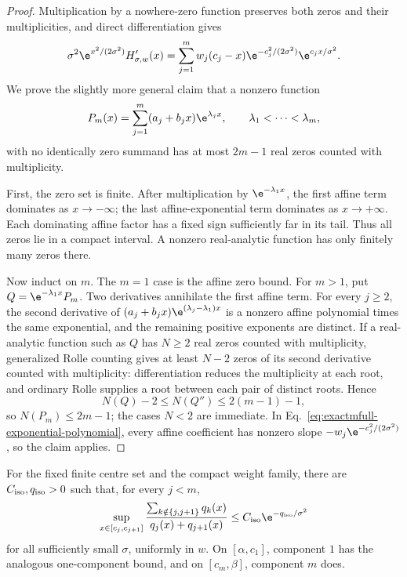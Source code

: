 \begin{proof}
Multiplication by a nowhere-zero function preserves both zeros and their
multiplicities, and direct differentiation gives
\begin{equation}
 \sigma^2\e^{x^2/(2\sigma^2)}H_{\sigma,w}'(x)
 =\sum_{j=1}^m w_j(c_j-x)
   \e^{-c_j^2/(2\sigma^2)}\e^{c_jx/\sigma^2}.
 \label{eq:exactmfull-exponential-polynomial}
\end{equation}
We prove the slightly more general claim that a nonzero function
\begin{equation}
 P_m(x)=\sum_{j=1}^m(a_j+b_jx)\e^{\lambda_jx},
 \qquad \lambda_1<\cdots<\lambda_m,
 \label{eq:exactmfull-general-exp-polynomial}
\end{equation}
with no identically zero summand has at most \(2m-1\) real zeros counted
with multiplicity.

First, the zero set is finite.  After multiplication by
\(\e^{-\lambda_1x}\), the first affine term dominates as \(x\to-\infty\);
the last affine-exponential term dominates as \(x\to+\infty\).  Each
dominating affine factor has a fixed sign sufficiently far in its tail.
Thus all zeros lie in a compact interval.  A nonzero real-analytic function
has only finitely many zeros there.

Now induct on \(m\).  The \(m=1\) case is the affine zero bound.  For
\(m>1\), put \(Q=\e^{-\lambda_1x}P_m\).  Two derivatives annihilate the first
affine term.  For every \(j\ge2\), the second derivative of
\((a_j+b_jx)\e^{(\lambda_j-\lambda_1)x}\) is a nonzero affine polynomial
times the same exponential, and the remaining positive exponents are
distinct.  If a real-analytic function such as \(Q\) has \(N\ge2\) real
zeros counted with
multiplicity, generalized Rolle counting gives at least \(N-2\) zeros of
its second derivative counted with multiplicity: differentiation reduces
the multiplicity at each root, and ordinary Rolle supplies a root between
each pair of distinct roots.  Hence
\begin{equation}
 N(Q)-2\le N(Q'')\le2(m-1)-1,
 \label{eq:exactmfull-rolle-count}
\end{equation}
so \(N(P_m)\le2m-1\); the cases \(N<2\) are immediate.  In
Eq.~\eqref{eq:exactmfull-exponential-polynomial}, every affine coefficient
has nonzero slope
\(-w_j\e^{-c_j^2/(2\sigma^2)}\), so the claim applies.
\end{proof}

\begin{lemma}
\label{lem:exactmfull-adjacent-isolation}
For the fixed finite centre set and the compact weight family, there are
\(C_{\rm iso},q_{\rm iso}>0\) such that, for every \(j<m\),
\begin{equation}
 \sup_{x\in[c_j,c_{j+1}]}
 \frac{\sum_{k\notin\{j,j+1\}}q_k(x)}
      {q_j(x)+q_{j+1}(x)}
 \le C_{\rm iso}\e^{-q_{\rm iso}/\sigma^2}
 \label{eq:exactmfull-adjacent-isolation}
\end{equation}
for all sufficiently small \(\sigma\), uniformly in \(w\).  On
\([\alpha,c_1]\), component \(1\) has the analogous one-component bound, and
on \([c_m,\beta]\), component \(m\) does.
\end{lemma}

